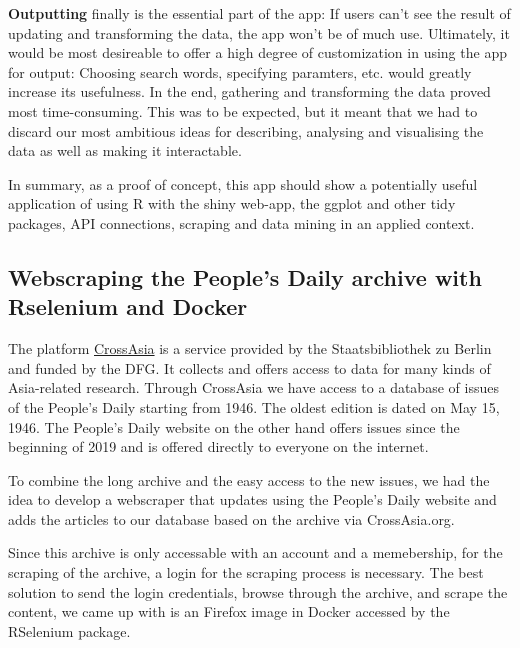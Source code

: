 \documentclass[12pt,a4paper]{article}
\begin{document}
\textbf{Outputting} finally is the essential part of the app: If users can't see the result of updating and transforming the data, the app won't be of much use. Ultimately, it would be most desireable to offer a high degree of customization in using the app for output: Choosing search words, specifying paramters, etc. would greatly increase its usefulness. In the end, gathering and transforming the data proved most time-consuming. This was to be expected, but it meant that we had to discard our most ambitious ideas for describing, analysing and visualising the data as well as making it interactable.

In summary, as a proof of concept, this app should show a potentially useful application of using R with the shiny web-app, the ggplot and other tidy packages, API connections, scraping and data mining in an applied context.

\hypertarget{webscraping-the-peoples-daily-archive-with-rselenium-and-docker}{%
\subsection{Webscraping the People's Daily archive with Rselenium and Docker}\label{webscraping-the-peoples-daily-archive-with-rselenium-and-docker}}

The platform \href{CrossAsia.org}{CrossAsia} is a service provided by the Staatsbibliothek zu Berlin and funded by the DFG. It collects and offers access to data for many kinds of Asia-related research. Through CrossAsia we have access to a database of issues of the People's Daily starting from 1946. The oldest edition is dated on May 15, 1946. The People's Daily website on the other hand offers issues since the beginning of 2019 and is offered directly to everyone on the internet.

To combine the long archive and the easy access to the new issues, we had the idea to develop a webscraper that updates using the People's Daily website and adds the articles to our database based on the archive via CrossAsia.org.

Since this archive is only accessable with an account and a memebership, for the scraping of the archive, a login for the scraping process is necessary. The best solution to send the login credentials, browse through the archive, and scrape the content, we came up with is an Firefox image in Docker accessed by the RSelenium package.
\end{document}
